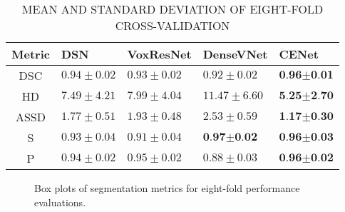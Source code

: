 \documentclass[journal]{IEEEtran}
\begin{document}
\begin{table}[t]%
\renewcommand{\arraystretch}{1.7}
\captionsetup{justification=centering, labelsep=newline}
\caption{MEAN AND STANDARD DEVIATION OF EIGHT-FOLD CROSS-VALIDATION}
\label{table:results_stat}
\begin{tabularx}{\linewidth}{c||X|X|X|X}
Metric & DSN \cite{dou20173d} & VoxResNet \cite{chen2017voxresnet} & DenseVNet \cite{gibson2018automatic} & CENet\\
\hline
DSC & \(0.94\pm0.02\) & \(0.93\pm0.02\) & \(0.92\pm0.02\) & \(\textbf{0.96}\pmb{\pm}\textbf{0.01}\)\\
HD & \(7.49\pm4.21\) & \(7.99\pm4.04\) & \(11.47\pm6.60\) & \(\textbf{5.25}\pmb{\pm}\textbf{2.70}\)\\
ASSD & \(1.77\pm0.51\) & \(1.93\pm0.48\) & \(2.53\pm0.59\) & \(\textbf{1.17}\pmb{\pm}\textbf{0.30}\)\\
S & \(0.93\pm0.04\) & \(0.91\pm0.04\) & \(\textbf{0.97}\pmb{\pm}\textbf{0.02}\) & \(\textbf{0.96}\pmb{\pm}\textbf{0.03}\)\\
P & \(0.94\pm0.02\) & \(0.95\pm0.02\) & \(0.88\pm0.03\) & \(\textbf{0.96}\pmb{\pm}\textbf{0.02}\)\\
\end{tabularx}
\end{table}

\begin{figure}
    \centering
        \vfil
        \vfil
        \vfil
        \vfil
        \vfil
        \vfil
    \caption{Box plots of segmentation metrics for eight-fold performance evaluations.}
    \label{fig:plot}
\end{figure}
\end{document}
